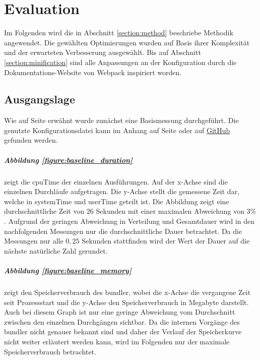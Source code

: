 \documentclass[11pt]{report}
\begin{document}
	\chapter{Evaluation}
		Im Folgenden wird die in Abschnitt \ref{section:method} beschriebe Methodik angewendet. Die gewählten Optimierungen wurden auf Basis ihrer Komplexität und der erwarteten Verbesserung ausgewählt. Bis auf Abschnitt \ref{section:minification} sind alle Anpassungen an der Konfiguration durch die Dokumentations-Website von Webpack inspiriert worden\cite{optimization-source:webpack}.
	
		\section{Ausgangslage}
			Wie auf Seite \pageref{baseline-build} erwähnt wurde zunächst eine Basismessung durchgeführt. Die genutzte Konfigurationsdatei kann im Anhang auf Seite \pageref{figure:baselineConfiguration} oder auf \href{https://github.com/TexNAK/WebBundlerOptimization/blob/d018b3e0db6a861c4f41e38e7265ca8f9d500319/webpack-project/webpack.config.js}{GitHub} gefunden werden.			\paragraph{Abbildung \ref{figure:baseline_duration}} zeigt die \Gls{cpuTime} der einzelnen Ausführungen. Auf der x-Achse sind die einzelnen Durchläufe aufgetragen. Die y-Achse stellt die gemessene Zeit dar, welche in \Gls{systemTime} und \Gls{userTime} geteilt ist. Die Abbildung zeigt eine durchschnittliche Zeit von $26$ Sekunden mit einer maximalen Abweichung von $3 \%$. Aufgrund der geringen Abweichung in Verteilung und Gesamtdauer wird in den nachfolgenden Messungen nur die durchschnittliche Dauer betrachtet. Da die Messungen nur alle $0,25$ Sekunden stattfinden wird der Wert der Dauer auf die nächste natürliche Zahl gerundet.
			\paragraph{Abbildung \ref{figure:baseline_memory}} zeigt den Speicherverbrauch des \Gls{bundler}, wobei die x-Achse die vergangene Zeit seit Prozessstart und die y-Achse den Speicherverbrauch in Megabyte darstellt. Auch bei diesem Graph ist nur eine geringe Abweichung vom Durchschnitt zwischen den einzelnen Durchgängen sichtbar. Da die internen Vorgänge des \Gls{bundler} nicht genauer bekannt sind und daher der Verlauf der Speicherkurve nicht weiter erläutert werden kann, wird im Folgenden nur der maximale Speicherverbrauch betrachtet.
\end{document}
